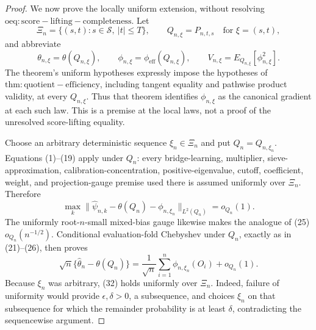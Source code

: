 \documentclass{article}
\begin{document}
\begin{proof}
We now prove the locally uniform extension, without resolving \(\mathrm{oeq:score-lifting-completeness}\).  Let
\[
 \Xi_n=\{(s,t):s\in\mathcal S,\ |t|\le T\},\qquad
 Q_{n,\xi}=P_{n,t,s}\quad\text{for }\xi=(s,t),
\]
and abbreviate
\[
 \theta_{n,\xi}=\theta(Q_{n,\xi}),\qquad
 \phi_{n,\xi}=\phi_{\mathrm{eff}}(Q_{n,\xi}),\qquad
 V_{n,\xi}=E_{Q_{n,\xi}}[\phi_{n,\xi}^2].
\]
The theorem's uniform hypotheses expressly impose the hypotheses of \(\mathrm{thm:quotient-efficiency}\), including tangent equality and pathwise product validity, at every \(Q_{n,\xi}\).  Thus that theorem identifies \(\phi_{n,\xi}\) as the canonical gradient at each such law.  This is a premise at the local laws, not a proof of the unresolved score-lifting equality.

Choose an arbitrary deterministic sequence \(\xi_n\in\Xi_n\) and put \(Q_n=Q_{n,\xi_n}\).  Equations (1)--(19) apply under \(Q_n\): every bridge-learning, multiplier, sieve-approximation, calibration-concentration, positive-eigenvalue, cutoff, coefficient, weight, and projection-gauge premise used there is assumed uniformly over \(\Xi_n\).  Therefore
\[
 \max_k\|\widehat\psi_{n,k}-\theta(Q_n)-\phi_{n,\xi_n}\|_{L^2(Q_n)}
 =o_{Q_n}(1).                                                               \tag{31}
\]
The uniformly root-\(n\)-small mixed-bias gauge likewise makes the analogue of (25) \(o_{Q_n}(n^{-1/2})\).  Conditional evaluation-fold Chebyshev under \(Q_n\), exactly as in (21)--(26), then proves
\[
 \sqrt n\{\widehat\theta_n-\theta(Q_n)\}
 =\frac1{\sqrt n}\sum_{i=1}^n\phi_{n,\xi_n}(O_i)+o_{Q_n}(1).              \tag{32}
\]
Because \(\xi_n\) was arbitrary, (32) holds uniformly over \(\Xi_n\).  Indeed, failure of uniformity would provide \(\epsilon,\delta>0\), a subsequence, and choices \(\xi_n\) on that subsequence for which the remainder probability is at least \(\delta\), contradicting the sequencewise argument.


\end{proof}
\end{document}
